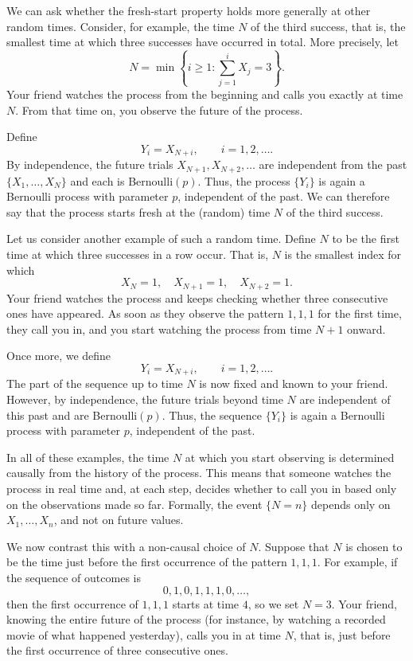 We can ask whether the fresh-start property holds more generally at other random times.  
Consider, for example, the time \(N\) of the third success, that is, the smallest time at which three successes have occurred in total.  
More precisely, let
\[
N = \min\left\{i \geq 1 : \sum_{j=1}^{i} X_j = 3\right\}.
\]
Your friend watches the process from the beginning and calls you exactly at time \(N\).  
From that time on, you observe the future of the process.  

Define
\[
Y_i = X_{N + i},
\qquad
i = 1,2,\ldots.
\]
By independence, the future trials \(X_{N+1},X_{N+2},\ldots\) are independent from the past \(\{X_1,\ldots,X_N\}\) and each is Bernoulli\((p)\).  
Thus, the process \(\{Y_i\}\) is again a Bernoulli process with parameter \(p\), independent of the past.  
We can therefore say that the process starts fresh at the (random) time \(N\) of the third success.  

Let us consider another example of such a random time.  
Define \(N\) to be the first time at which three successes in a row occur.  
That is, \(N\) is the smallest index for which
\[
X_{N} = 1, \quad X_{N+1} = 1, \quad X_{N+2} = 1.
\]
Your friend watches the process and keeps checking whether three consecutive ones have appeared.  
As soon as they observe the pattern \(1,1,1\) for the first time, they call you in, and you start watching the process from time \(N+1\) onward.  

Once more, we define
\[
Y_i = X_{N + i},
\qquad
i = 1,2,\ldots.
\]
The part of the sequence up to time \(N\) is now fixed and known to your friend.  
However, by independence, the future trials beyond time \(N\) are independent of this past and are Bernoulli\((p)\).  
Thus, the sequence \(\{Y_i\}\) is again a Bernoulli process with parameter \(p\), independent of the past.  

In all of these examples, the time \(N\) at which you start observing is determined causally from the history of the process.  
This means that someone watches the process in real time and, at each step, decides whether to call you in based only on the observations made so far.  
Formally, the event \(\{N = n\}\) depends only on \(X_1,\ldots,X_n\), and not on future values.  

We now contrast this with a non-causal choice of \(N\).  
Suppose that \(N\) is chosen to be the time just before the first occurrence of the pattern \(1,1,1\).  
For example, if the sequence of outcomes is
\[
0,1,0,1,1,1,0,\ldots,
\]
then the first occurrence of \(1,1,1\) starts at time \(4\), so we set \(N = 3\).  
Your friend, knowing the entire future of the process (for instance, by watching a recorded movie of what happened yesterday), calls you in at time \(N\), that is, just before the first occurrence of three consecutive ones.  

